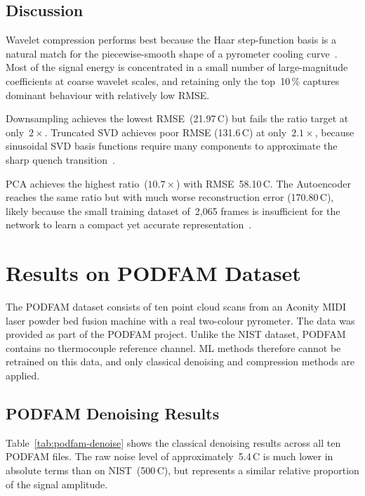 \subsection{Discussion}

Wavelet compression performs best because the Haar step-function basis is a
natural match for the piecewise-smooth shape of a pyrometer cooling
curve~\cite{learnable_wavelet}. Most of the signal energy is concentrated in a
small number of large-magnitude coefficients at coarse wavelet scales, and
retaining only the top~10\,\% captures dominant behaviour with relatively
low RMSE.

Downsampling achieves the lowest RMSE~(21.97\,\textdegree C) but fails the
ratio target at only~$2\times$. Truncated SVD achieves poor RMSE
(131.6\,\textdegree C) at only~$2.1\times$, because sinusoidal SVD basis
functions require many components to approximate the sharp quench
transition~\cite{golub2013matrix}.

PCA achieves the highest ratio~($10.7\times$) with RMSE~58.10\,\textdegree C.
The Autoencoder reaches the same ratio but with much worse reconstruction error
(170.80\,\textdegree C), likely because the small training dataset of~2,065
frames is insufficient for the network to learn a compact yet accurate
representation~\cite{autoencoder_compression}.

\section{Results on PODFAM Dataset}
\label{sec:podfam-results}

The PODFAM dataset consists of ten point cloud scans from an Aconity MIDI laser
powder bed fusion machine with a real two-colour pyrometer. The data was provided
as part of the PODFAM project. Unlike the NIST dataset, PODFAM contains no
thermocouple reference channel. ML methods therefore cannot be retrained on this
data, and only classical denoising and compression methods are applied.

\subsection{PODFAM Denoising Results}

Table~\ref{tab:podfam-denoise} shows the classical denoising results across all
ten PODFAM files. The raw noise level of approximately~5.4\,\textdegree C is
much lower in absolute terms than on NIST~(500\,\textdegree C), but represents
a similar relative proportion of the signal amplitude.

